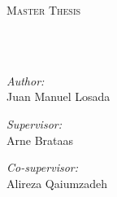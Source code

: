 \documentclass[
11pt, %
english, %
singlespacing, %
headsepline, %
]{MastersDoctoralThesis} %
\author{Juan Manuel Losada} %
\begin{document}
\frontmatter %

\pagestyle{plain} %


\begin{titlepage}
\begin{center}

\vspace*{.06\textheight}
{\scshape\LARGE \univname\par}\vspace{1.5cm} %
\textsc{\Large Master Thesis}\\[0.5cm] %

\HRule \\[0.4cm] %
{\huge \bfseries \ttitle\par}\vspace{0.4cm} %
\HRule \\[1.5cm] %
 
\begin{minipage}[t]{0.4\textwidth}
\begin{flushleft} \large
\emph{Author:}\\
Juan Manuel Losada
\end{flushleft}
\end{minipage}
\begin{minipage}[t]{0.4\textwidth}
\begin{flushright}
\emph{Supervisor:} \\
Arne Brataas

\emph{Co-supervisor:}\\
Alireza Qaiumzadeh
\end{flushright}

\end{minipage}\\[3cm]
 
\end{center}
\end{titlepage}

\tableofcontents %

\mainmatter %
\pagestyle{thesis} %
\end{document}
